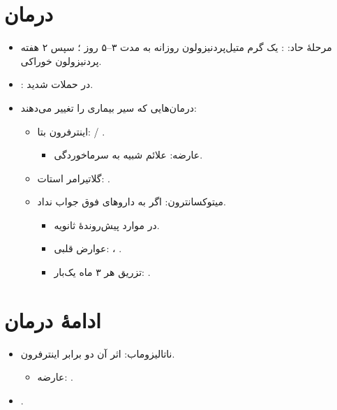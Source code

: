 \documentclass[a4paper,12pt]{extbook}
\begin{document}
\section*{درمان }
\begin{itemize}
\item مرحلهٔ حاد: : یک گرم متیل‌پردنیزولون روزانه به مدت ۳–۵ روز ؛ سپس ۲ هفته پردنیزولون خوراکی.
\item {}: در حملات شدید.
\item درمان‌هایی که سیر بیماری را تغییر می‌دهند:
\begin{itemize}
\item اینترفرون بتا:  / .
\begin{itemize}
\item عارضه: علائم شبیه به سرماخوردگی.
\end{itemize}
\item گلاتیرامر استات: .
\item میتوکسانترون: اگر به داروهای فوق جواب نداد.
\begin{itemize}
\item در موارد پیش‌روندهٔ ثانویه.
\item عوارض قلبی: ، .
\item تزریق هر ۳ ماه یک‌بار: .
\end{itemize}
\end{itemize}
\end{itemize}

\section*{ادامهٔ درمان }
\begin{itemize}
\item ناتالیزوماب: اثر آن دو برابر اینترفرون.
\begin{itemize}
\item عارضه: .
\end{itemize}
\item {}.
\end{itemize}
\end{document}
